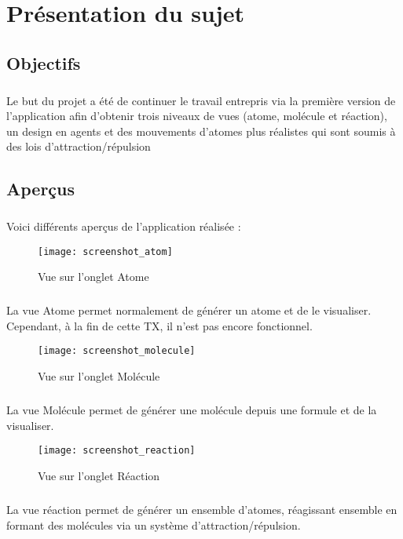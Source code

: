\chapter{Présentation du sujet}
\label{presentation_sujet}

\section{Objectifs}

\paragraph{}
Le but du projet a été de continuer le travail entrepris via la première
version de l'application afin d'obtenir trois niveaux de vues (atome, molécule
et réaction), un design en agents et des mouvements d'atomes plus réalistes qui
sont soumis à des lois d'attraction/répulsion


\section{Aperçus}

\paragraph{}
Voici différents aperçus de l'application réalisée :

\begin{figure}[H]
\centering
\centerline{\texttt{[image: screenshot\_atom]}}
\caption{Vue sur l'onglet Atome}
\label{screenshot_atom}
\end{figure}

\paragraph{}
La vue Atome permet normalement de générer un atome et de le visualiser.
Cependant, à la fin de cette TX, il n'est pas encore fonctionnel.

\begin{figure}[H]
\centering
\centerline{\texttt{[image: screenshot\_molecule]}}
\caption{Vue sur l'onglet Molécule}
\label{screenshot_molecule}
\end{figure}

\paragraph{}
La vue Molécule permet de générer une molécule depuis une formule et de la
visualiser.


\begin{figure}[H]
\centering
\centerline{\texttt{[image: screenshot\_reaction]}}
\caption{Vue sur l'onglet Réaction}
\label{screenshot_reaction}
\end{figure}

\paragraph{}
La vue réaction permet de générer un ensemble d'atomes, réagissant ensemble en
formant des molécules via un système d'attraction/répulsion.
